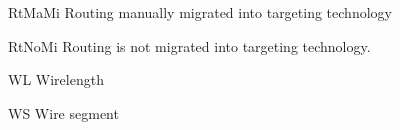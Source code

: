 \begin{SymEntry}
\item[RtMaMi]
Routing manually migrated into targeting technology

\item[RtNoMi]
Routing is not migrated into targeting technology.

\item[WL]
Wirelength

\item[WS]
Wire segment


%
%
%
%
%
%
%
%
%
%
% 
%
%
%
%
%
%
%
%
%
%
%

\end{SymEntry}
